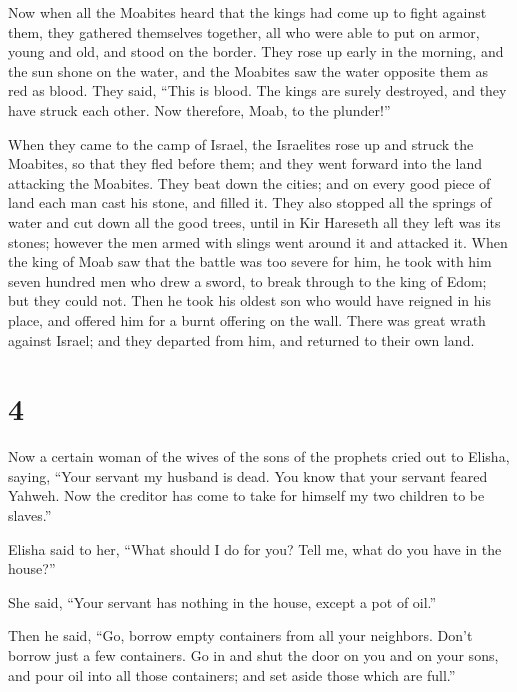  Now when all the Moabites heard that the kings had come
up to fight against them, they gathered themselves together, all who
were able to put on armor, young and old, and stood on the border.
 They rose up early in the morning, and the sun shone on
the water, and the Moabites saw the water opposite them as red as blood.
 They said, ``This is blood. The kings are surely
destroyed, and they have struck each other. Now therefore, Moab, to the
plunder!''

 When they came to the camp of Israel, the Israelites
rose up and struck the Moabites, so that they fled before them; and they
went forward into the land attacking the Moabites.  They
beat down the cities; and on every good piece of land each man cast his
stone, and filled it. They also stopped all the springs of water and cut
down all the good trees, until in Kir Hareseth all they left was its
stones; however the men armed with slings went around it and attacked
it.  When the king of Moab saw that the battle was too
severe for him, he took with him seven hundred men who drew a sword, to
break through to the king of Edom; but they could not. 
Then he took his oldest son who would have reigned in his place, and
offered him for a burnt offering on the wall. There was great wrath
against Israel; and they departed from him, and returned to their own
land.

\hypertarget{section-3}{%
\section{4}\label{section-3}}

 Now a certain woman of the wives of the sons of the
prophets cried out to Elisha, saying, ``Your servant my husband is dead.
You know that your servant feared Yahweh. Now the creditor has come to
take for himself my two children to be slaves.''

 Elisha said to her, ``What should I do for you? Tell me,
what do you have in the house?''

She said, ``Your servant has nothing in the house, except a pot of
oil.''

 Then he said, ``Go, borrow empty containers from all your
neighbors. Don't borrow just a few containers.  Go in and
shut the door on you and on your sons, and pour oil into all those
containers; and set aside those which are full.''

